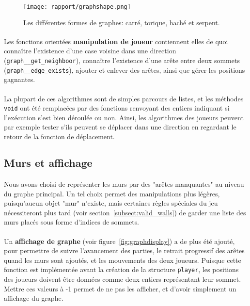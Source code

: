 \documentclass[a4paper]{article}
\begin{document}
\begin{figure}
    \centering
    \texttt{[image: rapport/graphshape.png]}
    \caption{Les différentes formes de graphes: carré, torique, haché et serpent.}
    \label{fig:graphshape}
\end{figure}

\paragraph{}
Les fonctions orientées \textbf{manipulation de joueur} contiennent elles de quoi connaître l'existence d'une case voisine dans une direction (\texttt{graph\_\_get\_neighboor}), connaître l'existence d'une arête entre deux sommets (\texttt{graph\_\_edge\_exists}), ajouter et enlever des arêtes, ainsi que gérer les positions gagnantes.

\paragraph{}
La plupart de ces algorithmes sont de simples parcours de listes, et les méthodes \texttt{void} ont été remplacées par des fonctions renvoyant des entiers indiquant si l'exécution s'est bien déroulée ou non. Ainsi, les algorithmes des joueurs peuvent par exemple tester s'ils peuvent se déplacer dans une direction en regardant le retour de la fonction de déplacement.

\subsection{Murs et affichage}
\paragraph{}
Nous avons choisi de représenter les murs par des "arêtes manquantes" au niveau du graphe principal. Un tel choix permet des manipulations plus légères, puisqu'aucun objet "mur" n'existe, mais certaines règles spéciales du jeu nécessiteront plus tard (voir section~\ref{subsect:valid_walls}) de garder une liste des murs placés sous forme d'indices de sommets. 

\paragraph{}
Un \textbf{affichage de graphe} (voir figure~\ref{fig:graphdisplay}) a de plus été ajouté, pour permettre de suivre l'avancement des parties, le retrait progressif des arêtes quand les murs sont ajoutés, et les mouvements des deux joueurs. Puisque cette fonction est implémentée avant la création de la structure \texttt{player}, les positions des joueurs doivent être données comme deux entiers représentant leur sommet. Mettre ces valeurs à -1 permet de ne pas les afficher, et d'avoir simplement un affichage du graphe.
\end{document}
